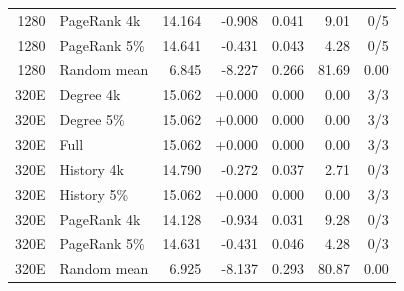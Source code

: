 \begin{table}[htbp]
\begin{tabular}{rlrrrrr}
1280 & PageRank 4k & 14.164 & -0.908 & 0.041 & 9.01 & 0/5 \\
1280 & PageRank 5\% & 14.641 & -0.431 & 0.043 & 4.28 & 0/5 \\
1280 & Random mean & 6.845 & -8.227 & 0.266 & 81.69 & 0.00 \\
320E & Degree 4k & 15.062 & +0.000 & 0.000 & 0.00 & 3/3 \\
320E & Degree 5\% & 15.062 & +0.000 & 0.000 & 0.00 & 3/3 \\
320E & Full & 15.062 & +0.000 & 0.000 & 0.00 & 3/3 \\
320E & History 4k & 14.790 & -0.272 & 0.037 & 2.71 & 0/3 \\
320E & History 5\% & 15.062 & +0.000 & 0.000 & 0.00 & 3/3 \\
320E & PageRank 4k & 14.128 & -0.934 & 0.031 & 9.28 & 0/3 \\
320E & PageRank 5\% & 14.631 & -0.431 & 0.046 & 4.28 & 0/3 \\
320E & Random mean & 6.925 & -8.137 & 0.293 & 80.87 & 0.00 \\
\bottomrule
\end{tabular}
\end{table}


